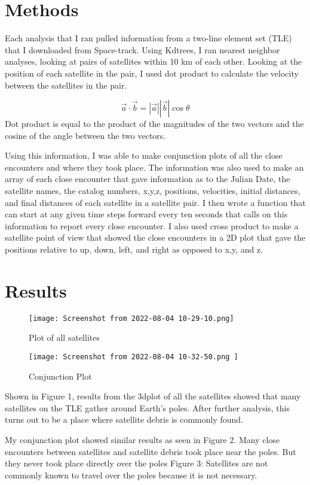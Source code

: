 \documentclass[11pt, a4paper, twocolumn]{article}
\begin{document}
\section{Methods}
\label{methods}

	Each analysis that I ran pulled information from a two-line element set (TLE) that I downloaded from Space-track. Using Kdtrees, I ran nearest neighbor analyses, looking at pairs of satellites within 10 km of each other.  Looking at the position of each satellite in the pair, I used dot product to calculate the velocity between the satellites in the pair. 

$$\vec{a} \cdot \vec{b}=\left | \vec{a} \right |\left | \vec{b} \right |\cos\theta $$
Dot product is equal to the product of the magnitudes of the two vectors and the cosine of the angle between the two vectors.

	Using this information, I was able to make conjunction plots of all the close encounters and where they took place. The information was also used to make an array of each close encounter that gave information as to the Julian Date, the satellite names, the catalog numbers,  x,y,z, positions, velocities, initial distances, and final distances of each satellite in a satellite pair. I then wrote a function that can start at any given time steps forward every ten seconds that calls on this information to report every close encounter. I also used cross product to make a satellite point of view that showed the close encounters in a 2D plot that gave the positions relative to up, down, left, and right as opposed to x,y, and z. 
	
	
\section{Results}
\label{results}

\begin{figure}
\texttt{[image: Screenshot from 2022-08-04 10-29-10.png]}
\caption{Plot of all satellites}

\texttt{[image: Screenshot from 2022-08-04 10-32-50.png ]}
\caption{Conjunction Plot}
\end{figure}
	Shown in Figure 1, results from the 3dplot of all the satellites showed that many satellites on the TLE gather around Earth's poles. After further analysis, this turns out to be a place where satellite debris is commonly found. 

	My conjunction plot showed similar results as seen in Figure 2.
Many close encounters between satellites and satellite debris took place near the poles. But they never took place directly over the poles Figure 3: Satellites are not commonly known to travel over the poles because it is not necessary. 
\end{document}
